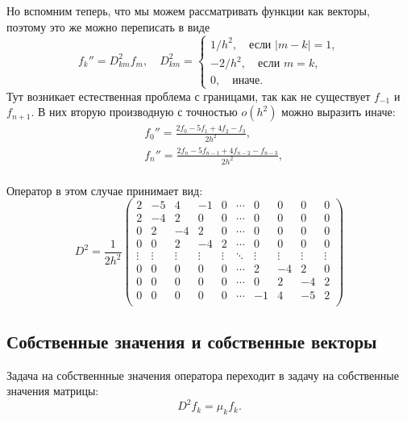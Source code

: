 \documentclass[a4paper,12pt]{article}
\begin{document}
	Но вспомним теперь, что мы можем рассматривать функции как векторы, поэтому это же можно переписать в виде
	\[
		f_k'' = D^2_{km}f_m,\quad D^2_{km} = \begin{cases}
			1/h^2, \quad \text{если } |m-k| = 1,\\
			-2/h^2, \quad \text{если } m=k,\\
			0, \quad \text{иначе}.
		\end{cases}
	\]
	Тут возникает естественная проблема с границами, так как не существует \( f_{-1} \) и \( f_{n+1} \). В них вторую производную с точностью \( o(h^2) \) можно выразить иначе:
	\begin{align*}
		& f_0'' = \frac{2f_0 - 5f_1 + 4f_2 - f_3}{2h^2},\\
		& f_n'' = \frac{2f_n - 5f_{n-1} + 4f_{n-2} - f_{n-3}}{2h^2},\\
	\end{align*}

	Оператор в этом случае принимает вид:
	\[
		D^2 = \frac{1}{2h^2}
		\begin{pmatrix}
			2 & -5 &  4 & -1 & 0 & \cdots & 0 & 0 & 0 & 0 \\
			2 & -4 &  2 &  0 & 0 & \cdots & 0 & 0 & 0 & 0 \\
			0 &  2 & -4 &  2 & 0 & \cdots & 0 & 0 & 0 & 0 \\
			0 &  0 &  2 & -4 & 2 & \cdots & 0 & 0 & 0 & 0 \\
			\vdots&\vdots&\vdots&\vdots&\vdots&\ddots&\vdots&\vdots&\vdots&\vdots\\
			0 &  0 &  0 &  0 & 0 & \cdots &  2 & -4 &  2 & 0 \\
			0 &  0 &  0 &  0 & 0 & \cdots &  0 &  2 & -4 & 2 \\
			0 &  0 &  0 &  0 & 0 & \cdots & -1 &  4 & -5 & 2 \\
		\end{pmatrix}
	\]
	
\subsection{Собственные значения и собственные векторы}
	Задача на собственнные значения оператора переходит в задачу на собственные значения матрицы:
	\[
		D^2 f_k = \mu_k f_k.
	\]
\end{document}
